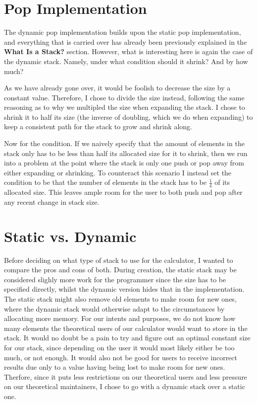 \documentclass[a4paper, 11pt]{article}
\begin{document}
\section {Pop Implementation}
	The dynamic pop implementation builds upon the static pop implementation,
	and everything that is carried over has already been previously explained in the \textbf{What Is a Stack?} section.
	However, what is interesting here is again the case of the dynamic stack.
	Namely, under what condition should it shrink? And by how much?
	\par
	As we have already gone over, it would be foolish to decrease the size by a constant value.
	Therefore, I chose to divide the size instead, following the same reasoning as to why we multipled the size when expanding the stack.
	I chose to shrink it to half its size (the inverse of doubling, which we do when expanding) to keep a consistent path for the stack to grow and shrink along.
	\par
	Now for the condition.
	If we naively specify that the amount of elements in the stack only has to be less than half its allocated size for it to shrink,
	then we run into a problem at the point where the stack is only one push or pop away from either expanding or shrinking.
	To counteract this scenario I instead set the condition to be that the number of elements in the stack has to be \(\frac{1}{4}\) of its allocated size.
	This leaves ample room for the user to both push and pop after any recent change in stack size.

\section {Static vs. Dynamic}
	Before deciding on what type of stack to use for the calculator, I wanted to compare the pros and cons of both.
	During creation, the static stack may be considered slighly more work for the programmer since the size has to be specified directly,
	whilst the dynamic version hides that in the implementation.
	The static stack might also remove old elements to make room for new ones, where the dynamic stack would otherwise adapt to the circumstances by allocating more memory.
	For our intents and purposes, we do not know how many elements the theoretical users of our calculator would want to store in the stack.
	It would no doubt be a pain to try and figure out an optimal constant size for our stack, since depending on the user it would most likely either be too much, or not enough.
	It would also not be good for users to receive incorrect results due only to a value having being lost to make room for new ones.
	Therfore, since it puts less restrictions on our theoretical users and less pressure on our theoretical maintainers, I chose to go with a dynamic stack over a static one.
\end{document}
